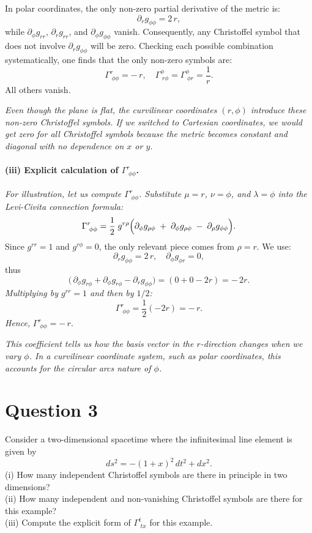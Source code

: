 In polar coordinates, the only non-zero partial derivative of the metric is:
\[
\partial_r g_{\phi\phi} = 2\,r,
\]
while \(\partial_\phi g_{rr}\), \(\partial_r g_{rr}\), and \(\partial_\phi g_{\phi\phi}\) vanish. Consequently, any Christoffel symbol that does not involve \(\partial_r g_{\phi\phi}\) will be zero. Checking each possible combination systematically, one finds that the only non-zero symbols are:
\[
\Gamma^r_{\;\phi\phi} = -\,r,
\quad
\Gamma^\phi_{\;r\phi} = \Gamma^\phi_{\;\phi r} = \frac{1}{r}.
\]
All others vanish.

\emph{Even though the plane is flat, the curvilinear coordinates \((r,\phi)\) introduce these non-zero Christoffel symbols. If we switched to Cartesian coordinates, we would get zero for all Christoffel symbols because the metric becomes constant and diagonal with no dependence on \(x\) or \(y\).}

\paragraph{(iii) Explicit calculation of \(\Gamma^r_{\;\phi\phi}\).}

\emph{For illustration, let us compute \(\Gamma^r_{\;\phi\phi}\). Substitute \(\mu = r\), \(\nu = \phi\), and \(\lambda = \phi\) into the Levi-Civita connection formula:}
\[
\Gamma^r_{\;\phi\phi}
=
\frac{1}{2}
\;g^{r\rho}
\Bigl(
\partial_\phi g_{\rho\phi}
\;+\;
\partial_\phi g_{\rho\phi}
\;-\;
\partial_\rho g_{\phi\phi}
\Bigr).
\]
Since \(g^{rr} = 1\) and \(g^{r\phi} = 0\), the only relevant piece comes from \(\rho = r\). We use:
\[
\partial_r g_{\phi\phi} = 2\,r,
\quad
\partial_\phi g_{\phi r} = 0,
\]
thus
\[
\bigl(\,\partial_\phi g_{r\phi} + \partial_\phi g_{r\phi} - \partial_r g_{\phi\phi}\bigr)
=
(0 + 0 - 2r)
=
-\,2r.
\]
\emph{Multiplying by \(g^{rr} = 1\) and then by \(1/2\):}
\[
\Gamma^r_{\;\phi\phi}
=
\frac12 (-2r)
=
-\,r.
\]
\emph{Hence,}
\(\boxed{\Gamma^r_{\;\phi\phi} = -\,r}.\)

\emph{This coefficient tells us how the basis vector in the \(r\)-direction changes when we vary \(\phi\). In a curvilinear coordinate system, such as polar coordinates, this accounts for the  circular arcs  nature of \(\phi\).}

\pagebreak

\section*{Question 3}

Consider a two-dimensional spacetime where the infinitesimal line element is given by
\[
ds^2 = -(1+x)^2 \, dt^2 + dx^2.
\]
(i) How many independent Christoffel symbols are there in principle in two dimensions?\\
(ii) How many independent and non-vanishing Christoffel symbols are there for this example?\\
(iii) Compute the explicit form of \(\Gamma^{t}_{\;tx}\) for this example.

